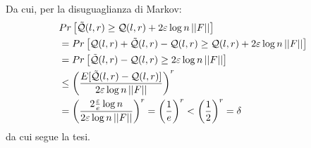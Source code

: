 \begin{proof*}
    Da cui, per la disuguaglianza di Markov:
    \begin{align}
        &Pr \left[\tilde{\mathcal{Q}}(l, r) \ge \mathcal{Q}(l, r)
            + 2 \varepsilon \log{n} \left|\left|F\right|\right|\right] \nonumber \\
        &=
        Pr \left[\mathcal{Q}(l, r) + \tilde{\mathcal{Q}}(l, r) - \mathcal{Q}(l, r) \ge \mathcal{Q}(l, r)
            + 2 \varepsilon \log{n} \left|\left|F\right|\right|\right] \nonumber \\
        &=
        Pr \left[\tilde{\mathcal{Q}}(l, r) - \mathcal{Q}(l, r) \ge
            2 \varepsilon \log{n} \left|\left|F\right|\right|\right] \nonumber \\
        &\le
        \left(
            \frac{E[\tilde{\mathcal{Q}}(l, r) - \mathcal{Q}(l, r)]}{2 \varepsilon \log{n} \left|\left|F\right|\right|}
        \right) ^ r
            \nonumber \\
        &=
        \left(
            \frac{2 \frac{\varepsilon}{e} \log{n}}{2 \varepsilon \log{n} \left|\left|F\right|\right|}
        \right)^r = \left(\frac{1}{e}\right)^r < \left(\frac{1}{2}\right)^r = \delta \nonumber 
    \end{align}
    da cui segue la tesi.

\end{proof*}